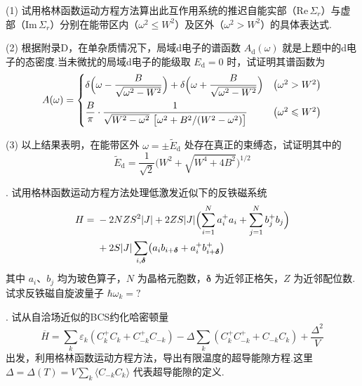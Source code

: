 (1) 试用格林函数运动方程方法算出此互作用系统的推迟自能实部（$\mathrm{Re}\,\Sigma_{r}$）与虚部（$\mathrm{Im}\,\Sigma_{r}$）分别在能带区内（$\omega^{2}\leqslant W^{2}$）及区外（$\omega^{2}>W^{2}$）的具体表达式.

(2) 根据附录D，在单杂质情况下，局域d电子的谱函数 $A_{\mathrm{d}}(\omega)$ 就是上题中的d电子的态密度.当未微扰的局域d电子的能级取 $E_{\mathrm{d}}=0$ 时，试证明其谱函数为
\begin{equation*}
  A(\omega)=
  \begin{cases}
    \delta\Bigl(\omega-\dfrac{B}{\sqrt{\omega^{2}-W^{2}}}\Bigr)
    +\delta\Bigl(\omega+\dfrac{B}{\sqrt{\omega^{2}-W^{2}}}\Bigr)
    & \left(\omega^{2}>W^{2}\right)\\[1em]
    \dfrac{B}{\pi}\cdot
    \dfrac{1}{\sqrt{W^{2}-\omega^{2}}\ \bigl[\omega^{2}+B^{2}/(W^{2}-\omega^{2})\bigr]}
    & \left(\omega^{2}\leqslant W^{2}\right)
  \end{cases}
\end{equation*}

(3) 以上结果表明，在能带区外 $\omega=\pm\widetilde{E}_{\mathrm{d}}$ 处存在真正的束缚态，试证明其中的
\begin{equation*}
  \widetilde{E}_{\mathrm{d}}=\frac{1}{\sqrt{2}}
  \bigl(W^{2}+\sqrt{W^{4}+4B^{2}}\bigr)^{1/2}
\end{equation*}

{.} 试用格林函数运动方程方法处理低激发近似下的反铁磁系统
\begin{equation*}
\begin{aligned}
  H={}&-2NZS^{2}|J|+2ZS|J|\Bigl(\sum_{i=1}^{N}a^{+}_{i}a_{i}
  +\sum_{j=1}^{N}b^{+}_{j}b_{j}\Bigr)\\
  &+2S|J|\sum_{i,\boldsymbol{\delta}}\bigl(a_{i}b_{i+\boldsymbol{\delta}}
  +a^{+}_{i}b^{+}_{i+\boldsymbol{\delta}}\bigr)
\end{aligned}
\end{equation*}
其中 $a_{i}$、$b_{j}$ 均为玻色算子，$N$ 为晶格元胞数，$\boldsymbol{\delta}$ 为近邻正格矢，$Z$ 为近邻配位数.试求反铁磁自旋波量子 $\hbar\omega_{k}=?$

{.} 试从自洽场近似的BCS约化哈密顿量
\begin{equation*}
  \overline{H}=\sum_{k}\varepsilon_{k}\left(C^{+}_{k}C_{k}+C^{+}_{-k}C_{-k}\right)
  -\Delta\sum_{k}\left(C^{+}_{k}C^{+}_{-k}+C_{-k}C_{k}\right)+\frac{\Delta^{2}}{V}
\end{equation*}
出发，利用格林函数运动方程方法，导出有限温度的超导能隙方程.这里 $\Delta=\Delta(T)=V\sum_{k}\langle C_{-k}C_{k}\rangle$ 代表超导能隙的定义.

